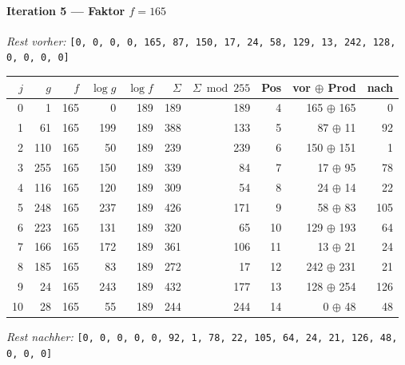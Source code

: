 \paragraph{Iteration 5 — Faktor $f = 165$}
\textit{Rest vorher:} \texttt{[0, 0, 0, 0, 165, 87, 150, 17, 24, 58, 129, 13, 242, 128, 0, 0, 0, 0]}\par
\begin{center}
\footnotesize
\setlength{\tabcolsep}{4pt}
\renewcommand{\arraystretch}{1.1}
\begin{tabular}{r|rr|rrrr|rrr}
\toprule
$j$ & $g$ & $f$ & $\log g$ & $\log f$ & $\Sigma$ & $\Sigma\bmod 255$ & Pos & vor $\oplus$ Prod & nach \\
\midrule
0 & 1 & 165 & 0 & 189 & 189 & 189 & 4 & 165 $\oplus$ 165 & 0 \\
1 & 61 & 165 & 199 & 189 & 388 & 133 & 5 & 87 $\oplus$ 11 & 92 \\
2 & 110 & 165 & 50 & 189 & 239 & 239 & 6 & 150 $\oplus$ 151 & 1 \\
3 & 255 & 165 & 150 & 189 & 339 & 84 & 7 & 17 $\oplus$ 95 & 78 \\
4 & 116 & 165 & 120 & 189 & 309 & 54 & 8 & 24 $\oplus$ 14 & 22 \\
5 & 248 & 165 & 237 & 189 & 426 & 171 & 9 & 58 $\oplus$ 83 & 105 \\
6 & 223 & 165 & 131 & 189 & 320 & 65 & 10 & 129 $\oplus$ 193 & 64 \\
7 & 166 & 165 & 172 & 189 & 361 & 106 & 11 & 13 $\oplus$ 21 & 24 \\
8 & 185 & 165 & 83 & 189 & 272 & 17 & 12 & 242 $\oplus$ 231 & 21 \\
9 & 24 & 165 & 243 & 189 & 432 & 177 & 13 & 128 $\oplus$ 254 & 126 \\
10 & 28 & 165 & 55 & 189 & 244 & 244 & 14 & 0 $\oplus$ 48 & 48 \\
\bottomrule
\end{tabular}
\end{center}
\textit{Rest nachher:} \texttt{[0, 0, 0, 0, 0, 92, 1, 78, 22, 105, 64, 24, 21, 126, 48, 0, 0, 0]}\par\medskip
